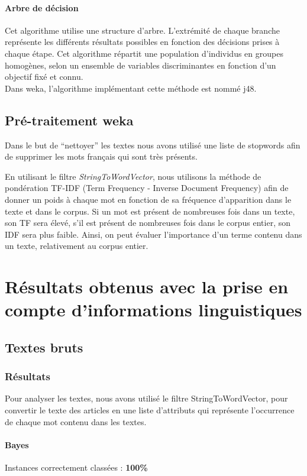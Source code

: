 \documentclass[a4paper,11pt]{article}
\begin{document}
\paragraph{Arbre de décision}
Cet algorithme utilise une structure d’arbre. L’extrémité de chaque branche représente les différents résultats possibles en fonction des décisions prises à chaque étape. Cet algorithme répartit une population d’individus en groupes homogènes, selon un ensemble de variables discriminantes en fonction d’un objectif fixé et connu.\\Dans weka, l’algorithme implémentant cette méthode est nommé j48.

\subsection{Pré-traitement weka}
Dans le but de “nettoyer” les textes nous avons utilisé une liste de stopwords afin de supprimer les mots français qui sont très présents.

En utilisant le filtre \textit{StringToWordVector}, nous utilisons la méthode de pondération TF-IDF (Term Frequency - Inverse Document Frequency) afin de donner un poids à chaque mot en fonction de sa fréquence d'apparition dans le texte et dans le corpus. Si un mot est présent de nombreuses fois dans un texte, son TF sera élevé, s’il est présent de nombreuses fois dans le corpus entier, son IDF sera plus faible. Ainsi, on peut évaluer l'importance d'un terme contenu dans un texte, relativement au corpus entier.

\newpage
\section{Résultats obtenus avec la prise en compte d'informations linguistiques}
\subsection{Textes bruts}
\subsubsection{Résultats}
Pour analyser les textes, nous avons utilisé le filtre StringToWordVector, pour convertir le texte des articles en une liste d’attributs qui représente l'occurrence de chaque mot contenu dans les textes.
\paragraph{Bayes} Instances correctement classées : \textbf{100\%}
\end{document}
